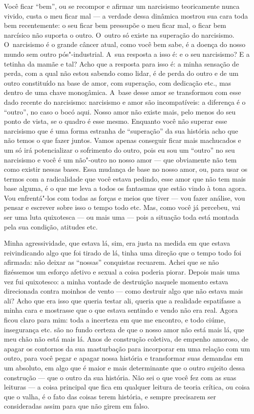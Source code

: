 Você ficar ``bem'', ou se recompor e afirmar um narcisismo teoricamente
nunca vivido, custa o meu ficar mal --- a verdade dessa dinâmica mostrou
sua cara toda bem recentemente: o seu ficar bem pressupõe o meu ficar
mal, o ficar bem narcísico não suporta o outro. O~outro só existe na
superação do narcisismo. O~narcisismo é o grande câncer atual, como você
bem sabe, é a doença do nosso mundo sem outro pós"-industrial. A~sua
resposta a isso é: e o seu narcisismo? E a tetinha da mamãe e tal? Acho
que a resposta para isso é: a minha sensação de perda, com a qual não
estou sabendo como lidar, é de perda do outro e de um outro constituído
na base de amor, com superação, com dedicação etc., mas dentro de uma
chave monogâmica. A~base desse amor se transformou com esse dado recente
do narcisismo: narcisismo e amor são incompatíveis: a diferença é o
``outro'', no caso o bocó aqui. Nosso amor não existe mais, pelo menos
do seu ponto de vista, se o quadro é esse mesmo. Enquanto você não
superar esse narcisismo que é uma forma estranha de ``superação'' da sua
história acho que não temos o que fazer juntos. Vamos apenas conseguir
ficar mais machucados e um só irá potencializar o sofrimento do outro,
pois eu sou um ``outro'' no seu narcisismo e você é um não"-outro no
nosso amor --- que obviamente não tem como existir nessas bases. Essa
mudança de base no nosso amor, ou, para usar os termos com a
radicalidade que você estava pedindo, esse amor que não tem mais base
alguma, é o que me leva a todos os fantasmas que estão vindo à tona
agora. Vou enfrentá"-los com todas as forças e meios que tiver --- vou
fazer análise, vou pensar e escrever sobre isso o tempo todo etc. Mas,
como você já percebeu, vai ser uma luta quixotesca --- ou mais uma ---
pois a situação toda está montada pela sua condição, atitudes etc.

Minha agressividade, que estava lá, sim, era justa na medida em que
estava reivindicando algo que foi tirado de lá, tinha uma direção que o
tempo todo foi afirmada: não deixar as ``nossas'' conquistas recuarem.
Achei que se não fizéssemos um esforço afetivo e sexual a coisa poderia
piorar. Depois mais uma vez fui quixotesco: a minha vontade de
destruição naquele momento estava direcionada contra moinhos de vento
--- como destruir algo que não estava mais ali? Acho que era isso que
queria testar ali, queria que a realidade espatifasse a minha cara e
mostrasse que o que estava sentindo e vendo não era real. Agora ficou
claro para mim: toda a incerteza em que me encontro, e todo ciúme,
insegurança etc. são no fundo certeza de que o nosso amor não está mais
lá, que meu chão não está mais lá. Anos de construção coletiva, de
empenho amoroso, de apagar os contornos da sua masturbação para
incorporar em uma relação com um outro, para você pegar e apagar nossa
história e transformar suas demandas em um absoluto, em algo que é maior
e mais determinante que o outro sujeito dessa construção --- que o outro
da sua história. Não sei o que você fez com as suas leituras --- a coisa
principal que fica em qualquer leitura de teoria crítica, ou coisa que o
valha, é o fato das coisas terem história, e sempre precisarem ser
consideradas assim para que não girem em falso.

